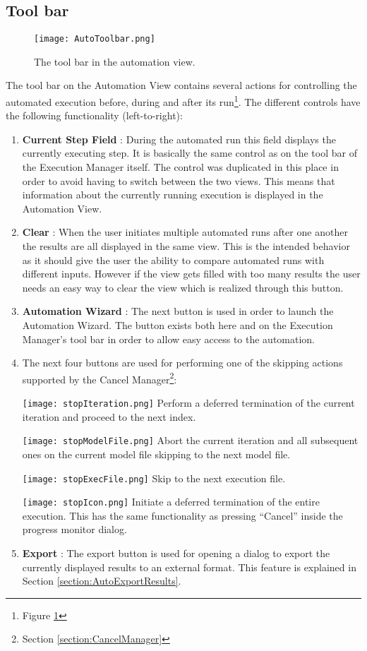 \subsection{Tool bar}
\label{section:AutoToolbar}
\begin{figure}
  \centering
  \texttt{[image: AutoToolbar.png]}
  \caption[The tool bar in the automation view.]%
  {The tool bar in the automation view.\protect}
  \label{fig:AutoToolbar}
\end{figure}
The tool bar on the Automation View contains several actions for controlling the automated 
execution before, during and after its run\footnote{Figure \ref{fig:AutoToolbar}}.
The different controls have the following functionality (left-to-right):
\begin{enumerate}
 \item \textbf{Current Step Field} : During the automated run this field displays the
currently executing step. It is basically the same control as on the tool bar of the 
Execution Manager itself. The control was duplicated in this place in order to avoid
having to switch between the two views. This means that information about the currently
running execution is displayed in the Automation View.
 \item \textbf{Clear} : When the user initiates multiple automated runs after one another
the results are all displayed in the same view. This is the intended behavior as it should 
give the user the ability to compare automated runs with different inputs. However if the 
view gets filled with too many results the user needs an easy way to clear the view which
is realized through this button.
 \item \textbf{Automation Wizard} : The next button is used in order to launch the 
Automation Wizard. The button exists both here and on the Execution Manager's tool bar
in order to allow easy access to the automation.
 \item The next four buttons are used for performing one of the skipping actions supported
by the Cancel Manager\footnote{Section \ref{section:CancelManager}}:

\texttt{[image: stopIteration.png]} Perform a deferred termination of the current 
iteration and proceed to the next index.

\texttt{[image: stopModelFile.png]} Abort the current iteration and all subsequent ones on the 
current model file skipping to the next model file.

\texttt{[image: stopExecFile.png]} Skip to the next execution file.

\texttt{[image: stopIcon.png]} Initiate a deferred termination of the entire execution. 
This has the same functionality as pressing ``Cancel'' inside the 
progress monitor dialog.

 \item \textbf{Export} : The export button is used for opening a dialog to export the currently displayed
results to an external format. This feature is explained in Section \ref{section:AutoExportResults}.
\end{enumerate}

